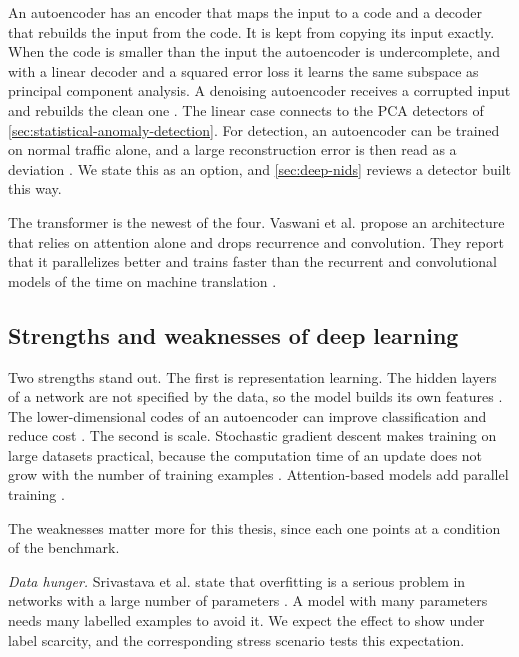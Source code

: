 An autoencoder has an encoder that maps the input to a code and a decoder that
rebuilds the input from the code. It is kept from copying its input exactly.
When the code is smaller than the input the autoencoder is undercomplete, and
with a linear decoder and a squared error loss it learns the same subspace as
principal component analysis. A denoising autoencoder receives a corrupted
input and rebuilds the clean one \citep{goodfellow2016deep}. The linear case
connects to the PCA detectors of \cref{sec:statistical-anomaly-detection}. For
detection, an autoencoder can be trained on normal traffic alone, and a large
reconstruction error is then read as a deviation \citep{mirsky2018kitsune}.
We state this as an option,
and \cref{sec:deep-nids} reviews a detector built this way.

The transformer is the newest of the four. Vaswani et al. propose an
architecture that relies on attention alone and drops recurrence and
convolution. They report that it parallelizes better and trains faster than
the recurrent and convolutional models of the time on machine translation
\citep{vaswani2017attention}.

\subsection{Strengths and weaknesses of deep learning}
\label{sec:dl-strengths-weaknesses}

Two strengths stand out. The first is representation learning. The hidden
layers of a network are not specified by the data, so the model builds its own
features \citep{goodfellow2016deep}. The lower-dimensional codes of an
autoencoder can improve classification and reduce cost
\citep{goodfellow2016deep}. The second is scale. Stochastic gradient descent
makes training on large datasets practical, because the computation time of an
update does not grow with the number of training examples
\citep{goodfellow2016deep}. Attention-based models
add parallel training \citep{vaswani2017attention}.

The weaknesses matter more for this thesis, since each one points at a
condition of the benchmark.

\emph{Data hunger.} Srivastava et al. state that overfitting is a serious
problem in networks with a large number of parameters
\citep{srivastava2014dropout}. A model with many parameters needs many
labelled examples to avoid it. We expect the effect to show under label
scarcity, and the corresponding stress scenario tests this expectation.

